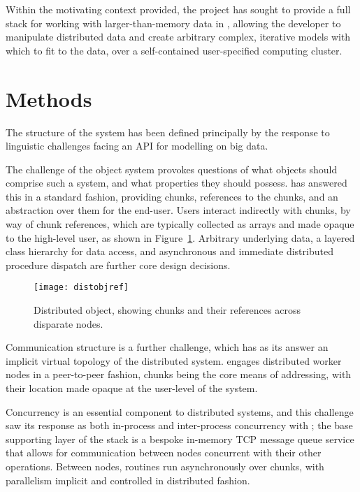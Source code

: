\documentclass[letterpaper, inpress]{jds} %
\begin{document}
Within the motivating context provided, the  project has sought to provide a full stack for working with larger-than-memory data in , allowing the developer to manipulate distributed data and create arbitrary complex, iterative models with which to fit to the data, over a self-contained user-specified computing cluster.

\section{Methods}

The structure of the  system has been defined principally by the response to linguistic challenges facing an API for modelling on big data.

The challenge of the object system provokes questions of what objects should comprise such a system, and what properties they should possess.
 has answered this in a standard fashion, providing chunks, references to the chunks, and an abstraction over them for the end-user. Users interact indirectly with chunks, by way of chunk references, which are typically collected as arrays and made opaque to the high-level user, as shown in Figure~\ref{fig:distobj}. Arbitrary underlying data, a layered class hierarchy for data access, and asynchronous and immediate distributed procedure dispatch are further core design decisions.

\begin{figure}[ht]
\begin{center}
\centerline{\texttt{[image: distobjref]}}
\caption{Distributed object, showing chunks and their references across disparate nodes.}
\label{fig:distobj}
\end{center}
\end{figure}

Communication structure is a further challenge, which has as its answer an implicit virtual topology of the distributed system.
 engages distributed worker nodes in a peer-to-peer fashion, chunks being the core means of addressing, with their location made opaque at the user-level of the system.

Concurrency is an essential component to distributed systems, and this challenge saw its response as both in-process and inter-process concurrency with ; the base supporting layer of the  stack is a bespoke in-memory TCP message queue service that allows for communication between nodes concurrent with their other operations.
Between nodes, routines run asynchronously over chunks, with parallelism implicit and controlled in distributed fashion.
\end{document}
